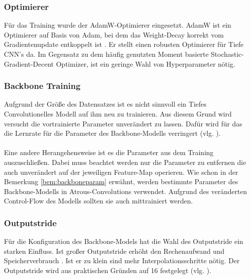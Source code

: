 \documentclass[12pt,DIV=15,BCOR=15mm,twoside,headsepline,abstract=true,listof=totoc,bibliography=totoc]{scrreprt}
\theoremstyle{remark}    %
\begin{document}
    \subsubsection{Optimierer}
    Für das Training wurde der AdamW-Optimierer eingesetzt. AdamW ist ein Optimierer auf Basis von Adam, bei dem das Weight-Decay korrekt vom 
    Gradientenupdate entkoppelt ist \cite{loshchilov2019decoupledweightdecayregularization}. Er stellt einen robusten Optimierer für Tiefe \ac{CNN}'s
    da. Im Gegensatz zu dem häufig genutzten Moment basierte Stochastic-Gradient-Decent Optimizer, ist ein geringe Wahl von Hyperparameter nötig.

    \subsubsection{Backbone Training}
    Aufgrund der Größe des Datensatzes ist es nicht sinnvoll ein Tiefes Convolutionelles Modell auf ihm neu zu trainieren. Aus diesem Grund wird versucht
    die vortrainierte Parameter unverändert zu lassen. Dafür wird für das die Lernrate für die Parameter des Backbone-Modells verringert 
    (vlg. \cite{chen2017rethinkingatrousconvolutionsemantic}).\\\\
    Eine andere Herangehensweise ist es die Parameter aus dem Training auszuschließen. Dabei muss beachtet werden nur die Parameter zu entfernen die auch
    unverändert auf der jeweiligen Feature-Map operieren. Wie schon in der Bemerkung \ref{bem:backboneparam} erwähnt, werden bestimmte Parameter des 
    Backbone-Modells in Atrous-Convolutions verwendet. Aufgrund des veränderten Control-Flow des Modells sollten sie auch mittrainiert werden.
    \subsubsection{Outputstride}
    Für die Konfiguration des Backbone-Models hat die Wahl des Outputstride ein starken Einfluss. Ist großer Outputstride erhöht den 
    Rechenaufwand und Speicherverbrauch \cite{chen2017rethinkingatrousconvolutionsemantic}. Ist er zu klein sind mehr Interpolationsschritte nötig.
    Der Outputstride wird aus praktischen Gründen auf 16 festgelegt (vlg. \cite{chen2017rethinkingatrousconvolutionsemantic}). 
\end{document}
